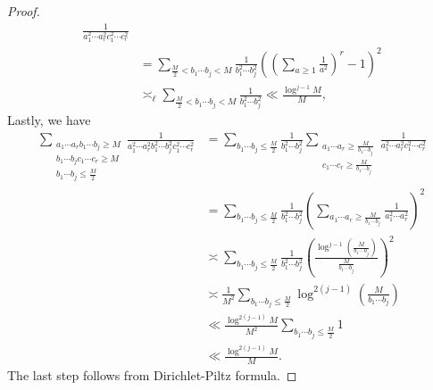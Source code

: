 \documentclass[12pt,a4paper]{amsart}
\begin{document}
\begin{proof}
\begin{align*}
\frac{1}{a_1^2\cdots a_r^2 c_1^2 \cdots c_r^2} \nonumber\\
&
=
\sum_{ \frac{M}{2}< b_1\cdots b_j< M } 
\frac{1}{b_1^2\cdots b_j^2}
\left(\left(\sum_{a\geq 1} \frac{1}{a^2}\right)^{r} -1 \right)^2 \nonumber\\
&\asymp_{\ell}
\sum_{ \frac{M}{2}< b_1\cdots b_j< M } 
\frac{1}{b_1^2\cdots b_j^2} \ll \frac{\log^{j-1}M}{M},
\end{align*}
Lastly, we have
\begin{align*}
\sum_{\substack{a_1 \cdots a_r b_1\cdots b_j\geq M \\ b_1\cdots b_j c_1 \cdots c_r\geq M \\ b_1\cdots b_j\leq \frac{M}{2}}} 
\frac{1}{a_1^2\cdots a_r^2 b_1^2\cdots b_j^2 c_1^2 \cdots c_r^2}
&=
\sum_{ b_1\cdots b_j \leq \frac{M}{2} } 
\frac{1}{b_1^2\cdots b_j^2}
\sum_{\substack{a_1 \cdots a_r\geq \frac{M}{b_1\cdots b_j} \\  c_1 \cdots c_r\geq \frac{M}{b_1\cdots b_j} }} 
\frac{1}{a_1^2\cdots a_r^2 c_1^2 \cdots c_r^2} \nonumber\\
&=
\sum_{  b_1\cdots b_j\leq  \frac{M}{2} } 
\frac{1}{b_1^2\cdots b_j^2}
\left(\sum_{ a_1 \cdots a_r\geq \frac{M}{b_1\cdots b_j} } 
\frac{1}{a_1^2\cdots a_r^2}\right)^2 \nonumber\\
&\asymp
\sum_{  b_1\cdots b_j \leq \frac{M}{2}} 
\frac{1}{b_1^2\cdots b_j^2}
\left( \frac{\log^{j-1}\left(\frac{M}{b_1\cdots b_j}\right) }{\frac{M}{b_1\cdots b_j}} \right)^2 \nonumber\\
&\asymp
\frac{1}{M^2}
\sum_{  b_1\cdots b_j \leq \frac{M}{2} } \log^{2(j-1)}\left(\frac{M}{b_1\cdots b_j}\right)
\nonumber\\
&\ll
\frac{\log^{2(j-1)}M}{M^2}
\sum_{  b_1\cdots b_j \leq \frac{M}{2} } 1
\nonumber\\
&\ll
\frac{\log^{2(j-1)}M}{M}.
\end{align*}
The last step follows from Dirichlet-Piltz formula.


\end{proof}
\end{document}
